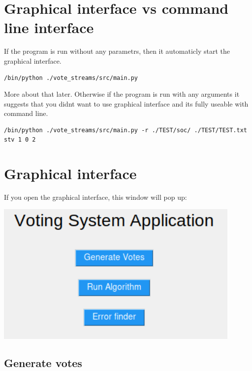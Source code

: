 \documentclass[a4paper,12pt]{report}
\begin{document}
	\pagestyle{toc}
	\tableofcontents
	\cleardoublepage
	\pagestyle{plain}
	\pagebreak

	\chapter{Graphical interface vs command line interface}
	
	If the program is run without any parametrs, then it automaticly start the graphical interface.
	
	\begin{lstlisting}
/bin/python ./vote_streams/src/main.py
	\end{lstlisting}
	
	More about that later. Otherwise if the program is run with any arguments it suggests that you didnt want to use graphical interface and its fully useable with command line.
	
	\begin{lstlisting}
/bin/python ./vote_streams/src/main.py -r ./TEST/soc/ ./TEST/TEST.txt stv 1 0 2
	\end{lstlisting}
	
	\chapter{Graphical interface}
	
	If you open the graphical interface, this window will pop up:
	
	\begin{center}
		\includegraphics[width=12cm]{user_interface_main.png}
	\end{center}
	
	\section{Generate votes}
	
\end{document}
